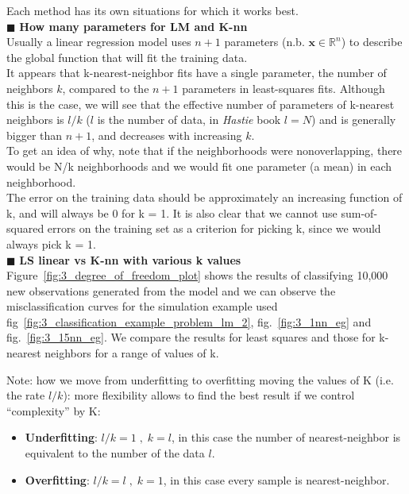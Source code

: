 \documentclass[../main.tex]{subfiles}
\begin{document}
Each method has its own situations for which it works best.\\

\noindent$\blacksquare$ \textbf{How many parameters for LM and K-nn}\\

Usually a linear regression model uses $n+1$ parameters (n.b. $\mathbf{x} \in \mathbb{R}^n$) to describe the global function that will fit the training data.\\
It appears that k-nearest-neighbor fits have a single parameter, the number of neighbors $k$, compared to the $n+1$ parameters in least-squares fits. Although this is the case, we will see that the effective number of parameters of k-nearest neighbors is $l/k$ ($l$ is the number of data, in \textit{Hastie} book $l=N$) and is generally bigger than $n+1$, and decreases with increasing $k$.\\

To get an idea of why, note that if the neighborhoods were nonoverlapping, there would be N/k neighborhoods and we would fit one parameter (a mean) in each neighborhood.\\

The error on the training data should be approximately an increasing function of k, and will always be 0 for k = 1.
It is also clear that we cannot use sum-of-squared errors on the training set as a criterion for picking k, since we would always pick k = 1.\\


\noindent$\blacksquare$ \textbf{LS linear vs K-nn with various k values}\\

Figure~\ref{fig:3_degree_of_freedom_plot} shows the results of classifying 10,000 new observations generated from the model and we can observe the misclassification curves for the simulation example used fig~\ref{fig:3_classification_example_problem_lm_2}, fig.~\ref{fig:3_1nn_eg} and fig.~\ref{fig:3_15nn_eg}. We compare the results for least squares and those for k-nearest neighbors for a range of values of k.


Note: how we move from underfitting to overfitting moving the values of K (i.e. the rate $l/k$): more flexibility allows to find the best result if we control “complexity” by K:
\begin{itemize}
    \item \textbf{Underfitting}: $l/k = 1 \;,\; k=l $, in this case the number of nearest-neighbor is equivalent to the number of the data $l$.
    \item \textbf{Overfitting}: $l/k = l \;,\; k=1 $, in this case every sample is nearest-neighbor.
\end{itemize}
\end{document}

